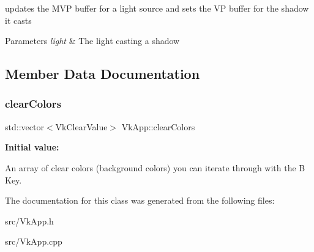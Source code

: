 updates the M\+VP buffer for a light source and sets the VP buffer for the shadow it casts 


\begin{DoxyParams}{Parameters}
{\em light} & The light casting a shadow \\
\hline
\end{DoxyParams}


\subsection{Member Data Documentation}
\mbox{\label{class_vk_app_a3a52b89d13e9ef9b0c7fb3176ae95d3a}} 
\subsubsection{\texorpdfstring{clearColors}{clearColors}}
{\footnotesize\ttfamily std\+::vector$<$Vk\+Clear\+Value$>$ Vk\+App\+::clear\+Colors\hspace{0.3cm}{\ttfamily [private]}}

{\bfseries Initial value\+:}
\begin{DoxyCode}{0}

\end{DoxyCode}


An array of clear colors (background colors) you can iterate through with the \textquotesingle{}B\textquotesingle{} Key. 



The documentation for this class was generated from the following files\+:\begin{DoxyCompactItemize}
\item 
src/Vk\+App.\+h\item 
src/Vk\+App.\+cpp\end{DoxyCompactItemize}
